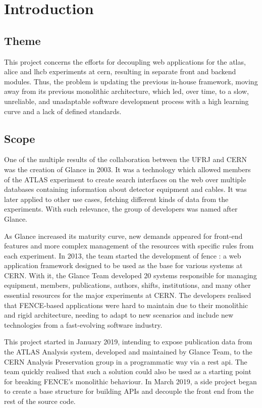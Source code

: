 \chapter{Introduction}
\label{chap1}

\section{Theme}

This project concerns the efforts for decoupling web applications for the \acrshort{atlas}, \acrshort{alice} and \acrshort{lhcb} experiments at \acrfull{cern}, resulting in separate front and backend modules. Thus, the problem is updating the previous in-house framework, moving away from its previous monolithic architecture, which led, over time, to a slow, unreliable, and unadaptable software development process with a high learning curve and a lack of defined standards.

\section{Scope}

One of the multiple results of the collaboration between the \acrfull{UFRJ} and CERN was the creation of Glance \cite{grael-tcc} in 2003. It was a technology which allowed members of the ATLAS experiment to create search interfaces on the web over multiple databases containing information about detector equipment and cables. It was later applied to other use cases, fetching different kinds of data from the experiments. With such relevance, the group of developers was named after Glance.

As Glance increased its maturity curve, new demands appeared for front-end features and more complex management of the resources with specific rules from each experiment. In 2013, the team started the development of \acrfull{fence} \cite{lange-tcc}: a web application framework designed to be used as the base for various systems at CERN. With it, the Glance Team developed 20 systems responsible for managing equipment, members, publications, authors, shifts, institutions, and many other essential resources for the major experiments at CERN. The developers realised that FENCE-based applications were hard to maintain due to their monolithic and rigid architecture, needing to adapt to new scenarios and include new technologies from a fast-evolving software industry.

This project started in January 2019, intending to expose publication data from the ATLAS Analysis system, developed and maintained by Glance Team, to the CERN Analysis Preservation group in a programmatic way via a \acrshort{rest} \acrshort{api}. The team quickly realised that such a solution could also be used as a starting point for breaking FENCE’s monolithic behaviour. In March 2019, a side project began to create a base structure for building APIs and decouple the front end from the rest of the source code.


